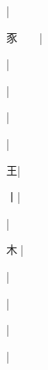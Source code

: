 \begin{multicols}{2}
{{\cjk{}{\cnsym{}　}{\cnsym{}　}{\cnsym{}　}}|{}\par
{\cjk{}豕{\cnsym{}　}{\cnsym{}　}}|{}\par
{\cjk{}{\cnsym{}　}{\cnsym{}　}{\cnsym{}　}}|{}\par
{\cjk{}{\cnsym{}　}{\cnsym{}　}{\cnsym{}　}}|{}\par
{\cjk{}{\cnsym{}　}{\cnsym{}　}{\cnsym{}　}}|{}\par
{\cjk{}{\cnsym{}　}{\cnsym{}　}{\cnsym{}　}}|{}\par
{\cjk{}{\cnsym{}　}{\cnsym{}　}王}|{}\par
{\cjk{}{\cnsym{}　}{\cnsym{}　}丨}|{}\par
{}|{}\par
{木{\cnjzr{}}}|{}\par
{}|{}\par
{}|{}\par
{\cjk{}{\cnsym{}　}{\cnsym{}　}{\cnsym{}　}}|{}\par
{\cjk{}{\cnsym{}　}{\cnsym{}　}{\cnsym{}　}}|{}\par
}
\end{multicols}
